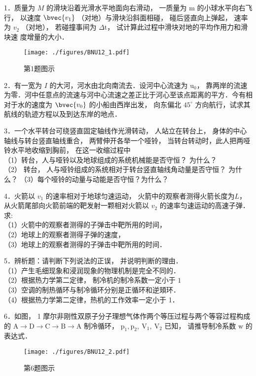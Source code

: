 
1．质量为 $M$ 的滑块沿着光滑水平地面向右滑动， 一质量为 $\mathrm{m}$ 的小球水平向右飞行， 以速度 $\bvec{v_1}$ （对地）与滑块沿斜面相碰， 碰后竖直向上弹起， 速率为
$v_2$ （对地）， 若碰撞事间为 $\Delta \mathrm{t}$， 试计算此过程中滑块对地的平均作用力和滑块速
度增量的大小．
\begin{figure}[ht]
\centering
\texttt{[image: ./figures/BNU12\_1.pdf]}
\caption{第1题图示} \label{BNU12_fig1}
\end{figure}

2．有一宽为 $I$ 的大河，河水由北向南流去．设河中心流速为 $\mathrm{u}_{0}$， 靠两岸的流速为零．河中任意点的流速与河中心流速之差正比于河心至该点距离的平方．今有相 对于水的速度为 $\bvec{v_0}$ 的小船由西岸出发， 向东偏北 $45^{\circ}$ 方向航行，试求其航线的轨迹方程以及到达东岸的地点．

3．一个水平转台可绕竖直固定轴线作光滑转动， 人站立在转台上， 身体的中心轴线与转台竖直轴线重合， 两臂伸开各举一个哑铃， 当转台转动时，此人把两哑铃水平地收缩到胸前， 在这一收缩过程中\\
（1）转台，人与哑铃以及地球组成的系统机械能是否守恒？ 为什么？\\
（2） 转台， 人与哑铃组成的系统相对于转台竖直轴线角动量是否守恒？ 为什么？
（3）每个哑铃的动量与动能是否守恒？为什么？

4．火箭以 $v_1$ 的速率相对于地球匀速运动， 火箭中的观察者测得火箭长度为$L$，从火箭尾部向火箭前端的靶发射一颗相对火箭以 $v_{2}$ 的速率匀速运动的高速子弹． 求: \\（1）火箭中的观察者测得的子弹击中靶所用的时间， \\（2）地球上的观察者测得子弹的速度， \\（3）地球上的观察者测得的子弹击中靶所用的时间．

5．辨析题：请判断下列说法的正误， 并说明判断的理由．\\
（1）产生毛细现象和浸润现象的物理机制是完全不同的．\\
（2）根据热力学第二定律， 制冷机的制冷系数一定小于 $1$\\
（3）空调的制热循环与制冷循环分别是正循环和逆頍环．\\
（4）根据热力学第二定律，热机的工作效率一定小于 1．

6．如图， 1 摩尔非刚性双原子分子理想气体作两个等压过程与两个等容过程构成的 $\mathrm{A} \rightarrow \mathrm{D} \rightarrow \mathrm{C} \rightarrow \mathrm{B} \rightarrow \mathrm{A}$
制冷循环， $\mathrm{p}_{1}, \mathrm{p}_{2}, \mathrm{~V}_{1}, \mathrm{~V}_{2}$ 已知， 请推导制冷系数 $\mathrm{w}$ 的表达式．
\begin{figure}[ht]
\centering
\texttt{[image: ./figures/BNU12\_2.pdf]}
\caption{第6题图示} \label{BNU12_fig2}
\end{figure}

